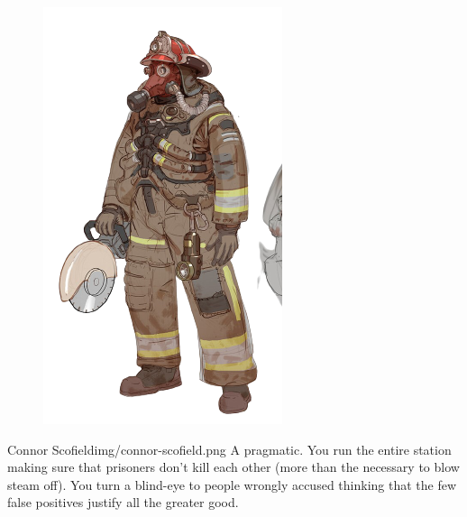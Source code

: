 \begin{figure}
    \centering
    \includegraphics[width=.85\textwidth]{img/bg/firefighter-1.png}
    \label{fig:refinery}
\end{figure}

\newsect

\clearpage


\begin{rpg-pcbox}{Connor Scofield}{img/connor-scofield.png}
    A pragmatic. You run the entire station making sure that prisoners don't kill each other (more than the necessary to blow steam off). You turn a blind-eye to people wrongly accused thinking that the few false positives justify all the greater good.
\end{rpg-pcbox}

